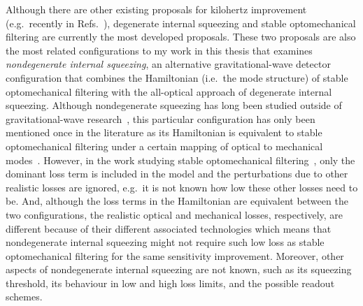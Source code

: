 Although there are other existing proposals for kilohertz improvement (e.g.\ recently in Refs.~\cite{hu2021quantum,Ganapathy_2021}), degenerate internal squeezing and stable optomechanical filtering are currently the most developed proposals. These two proposals are also the most related configurations to my work in this thesis that examines \emph{nondegenerate internal squeezing}, an alternative gravitational-wave detector configuration that combines the Hamiltonian (i.e.\ the mode structure) of stable optomechanical filtering with the all-optical approach of degenerate internal squeezing. %
Although nondegenerate squeezing has long been studied outside of gravitational-wave research~\cite{Andersen_2016}, this particular configuration has only been mentioned once in the literature as its Hamiltonian is equivalent to stable optomechanical filtering under a certain mapping of optical to mechanical modes~\cite{liBroadbandSensitivityImprovement2020}.
However, in the work studying stable optomechanical filtering~\cite{liBroadbandSensitivityImprovement2020,liEnhancingInterferometerSensitivity2021}, only the dominant loss term is included in the model and the perturbations due to other realistic losses are ignored, e.g.\ it is not known how low these other losses need to be. And, although the loss terms in the Hamiltonian are equivalent between the two configurations, the realistic optical and mechanical losses, respectively, are different because of their different associated technologies which means that nondegenerate internal squeezing might not require such low loss as stable optomechanical filtering for the same sensitivity improvement. Moreover, other aspects of nondegenerate internal squeezing are not known, such as its squeezing threshold, its behaviour in low and high loss limits, and the possible readout schemes.


